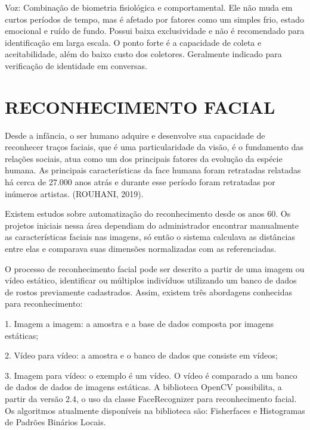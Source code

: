 Voz: Combinação de biometria fisiológica e comportamental. Ele não muda em curtos períodos de tempo, mas é afetado por fatores como um simples frio, estado emocional e ruído de fundo. Possui baixa exclusividade e não é recomendado para identificação em larga escala. O ponto forte é a capacidade de coleta e aceitabilidade, além do baixo custo dos coletores. Geralmente indicado para verificação de identidade em conversas.

\section{RECONHECIMENTO FACIAL}\label{sec:formatacaoTexto}

Desde a infância, o ser humano adquire e desenvolve sua capacidade de reconhecer traços faciais, que é uma particularidade da visão, é o fundamento das relações sociais, atua como um dos principais fatores da evolução da espécie humana. As principais características da face humana foram retratadas relatadas há cerca de 27.000 anos atrás e durante esse período foram retratadas por inúmeros artistas. (ROUHANI, 2019).

Existem estudos sobre automatização do reconhecimento desde os anos 60. Os projetos iniciais nessa área dependiam do administrador encontrar manualmente as características faciais nas imagens, só então o sistema calculava as distâncias entre elas e comparava suas dimensões normalizadas com as referenciadas.

O processo de reconhecimento facial pode ser descrito a partir de uma imagem ou vídeo estático, identificar ou múltiplos indivíduos utilizando um banco de dados de rostos previamente cadastrados. Assim, existem três abordagens conhecidas para reconhecimento:

1. Imagem a imagem: a amostra e a base de dados composta por imagens estáticas;

2. Vídeo para vídeo: a amostra e o banco de dados que consiste em vídeos;

3. Imagem para vídeo: o exemplo é um vídeo. O vídeo é comparado a um banco de dados de dados de imagens estáticas. A biblioteca OpenCV possibilita, a partir da versão 2.4, o uso da classe FaceRecognizer para reconhecimento facial. Os algoritmos atualmente disponíveis na biblioteca são: Fisherfaces e Histogramas de Padrões Binários Locais.